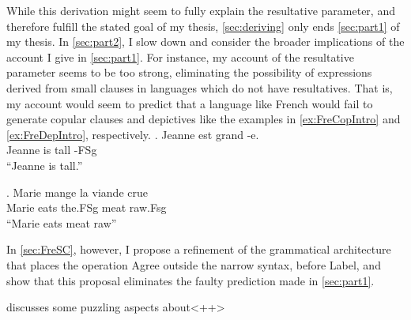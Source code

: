 \documentclass[MilwayThesis]{subfiles}
\begin{document}
While this derivation might seem to fully explain the resultative parameter, and therefore fulfill the stated goal of my thesis, \cref{sec:deriving} only ends \cref{sec:part1} of my thesis.
In \cref{sec:part2}, I slow down and consider the broader implications of the account I give in \cref{sec:part1}.
For instance, my account of the resultative parameter seems to be too strong, eliminating the possibility of expressions derived from small clauses in languages which do not have resultatives.
That is, my account would seem to predict that a language like French would fail to generate copular clauses and depictives like the examples in \cref{ex:FreCopIntro} and \cref{ex:FreDepIntro}, respectively.
\exg. \label{ex:FreCopIntro}Jeanne est grand -e.\\
Jeanne is tall -FSg\\
``Jeanne is tall.''

\exg. \label{ex:FreDepIntro}Marie mange la viande crue\\
Marie eats the.FSg meat raw.Fsg\\
``Marie eats meat raw''

In \cref{sec:FreSC}, however, I propose a refinement of the grammatical architecture that places the operation Agree outside the narrow syntax, before Label, and show that this proposal eliminates the faulty prediction made in \cref{sec:part1}.

 discusses some puzzling aspects about<++>
\end{document}
